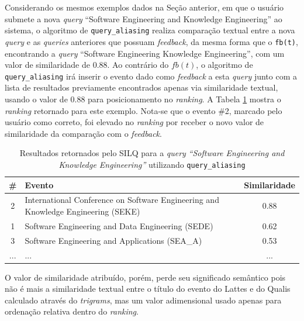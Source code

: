\documentclass[12pt]{article}
\newcommand{\quotes}[1]{``#1''}
\begin{document}
Considerando os mesmos exemplos dados na Seção anterior, em que o usuário submete a nova \textit{query}  \quotes{Software Engineering and Knowledge Engineering} ao sistema, o algoritmo de \texttt{query\_aliasing} realiza comparação textual entre a nova \textit{query} e as \textit{queries} anteriores que possuam \textit{feedback}, da mesma forma que o \texttt{fb(t)}, encontrando a \textit{query} \quotes{Software Engineering Knowledge Engineering}, com um valor de similaridade de $0.88$. Ao contrário do $fb(t)$, o algoritmo de \texttt{query\_aliasing} irá inserir o evento dado como \textit{feedback} a esta \textit{query} junto com a lista de resultados previamente encontrados apenas via similaridade textual, usando o valor de $0.88$ para posicionamento no \textit{ranking}. A Tabela \ref{tab:exemplo-qa} mostra o \textit{ranking} retornado para este exemplo. Nota-se que o evento \#2, marcado pelo usuário como correto, foi elevado no \textit{ranking} por receber o novo valor de similaridade da comparação com o \textit{feedback}.

\begin{table}[!h]
\begin{center}
\caption{Resultados retornados pelo SILQ para a \textit{query} \textit{\quotes{Software Engineering and Knowledge Engineering}} utilizando \texttt{query\_aliasing}} \label{tab:exemplo-qa}
\begin{tabular}{ c | p{7cm} | c }
\hline
\textbf{\#} & \textbf{Evento} & \textbf{Similaridade} \\ \hline
2 & International Conference on Software Engineering and Knowledge Engineering (SEKE) & 0.88 \\ \hline
1 & Software Engineering and Data Engineering (SEDE) & 0.62 \\ \hline
3 & Software Engineering and Applications (SEA\_A) & 0.53 \\ \hline
... & ... & ... \\ \hline
\end{tabular}
\end{center}
\end{table}

O valor de similaridade atribuído, porém, perde seu significado semântico pois não é mais a similaridade textual entre o título do evento do Lattes e do Qualis calculado através do \textit{trigrams}, mas um valor adimensional usado apenas para ordenação relativa dentro do \textit{ranking}.
\end{document}
